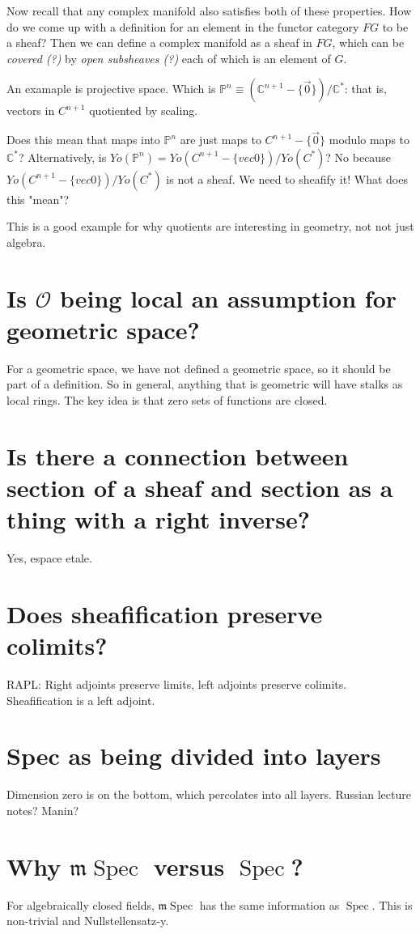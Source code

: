 \documentclass{book}
\newcommand{\C}{\ensuremath{\mathbb{C}}}
\renewcommand{\P}{\ensuremath{\mathbb{P}}}
\renewcommand{\O}{\ensuremath{\mathcal{O}}}
\newcommand{\spec}{\operatorname{Spec}}
\newcommand{\m}{\mathfrak{m}}
\newcommand{\mspec}{\m\operatorname{Spec}}
\theoremstyle{definition}
\begin{document}
Now recall that any complex manifold also satisfies both of these properties.
How do we come up with a definition for an element in the functor category $FG$
to be a sheaf? Then we can define a complex manifold as a sheaf in $FG$, which
can be \emph{covered (?)} by \emph{open subsheaves (?)} each of which is
an element of $G$.


An examaple is projective space. Which is $\P^n \equiv (\C^{n+1} - \{ \vec{0}\})/\C^*$: that is,
vectors in $C^{n+1}$ quotiented by scaling.

Does this mean that maps into $\P^n$ are just maps to $C^{n+1} - \{ \vec 0 \}$ modulo maps
to $\C^*$? Alternatively, is $Yo(\P^n) = Yo(C^{n+1} - \{vec 0 \})/Yo(C^*)$?
No because $Yo(C^{n+1} - \{vec 0 \})/Yo(C^*)$ is not a sheaf. We need to sheafify
it! What does this "mean"? 

This is a good example for why quotients are interesting in geometry, not
not just algebra.

\section{Is $\O$ being local an assumption for geometric space?}
For a geometric space, we have not defined a geometric space, so it should
be part of a definition. So in general, anything that is geometric
will have stalks as local rings. The key idea is that zero sets of functions
are closed.

\section{Is there a connection between section of a sheaf and section as a thing with a right inverse?}
Yes, espace etale.


\section{Does sheafification preserve colimits?}
RAPL: Right adjoints preserve limits, left adjoints preserve colimits. Sheafification
is a left adjoint.


\section{Spec as being divided into layers}

Dimension zero is on the bottom, which percolates into all layers. Russian lecture
notes? Manin?

\section{Why $\mspec$ versus $\spec$?}
For algebraically closed fields, $\mspec$ has the same information as $\spec$. This
is non-trivial and Nullstellensatz-y.
\end{document}

